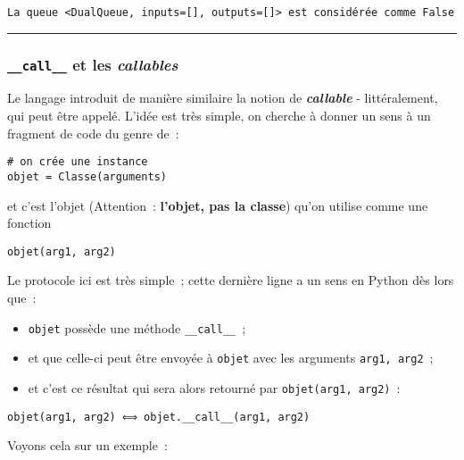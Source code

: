     \begin{Verbatim}[commandchars=\\\{\}]
La queue <DualQueue, inputs=[], outputs=[]> est considérée comme False

    \end{Verbatim}

    \begin{center}\rule{0.5\linewidth}{\linethickness}\end{center}

    \hypertarget{call__-et-les-callables}{%
\subsubsection{\texorpdfstring{\texttt{\_\_call\_\_} et les
\emph{callables}}{\_\_call\_\_ et les callables}}\label{call__-et-les-callables}}

    Le langage introduit de manière similaire la notion de
\textbf{\emph{callable}} - littéralement, qui peut être appelé. L'idée
est très simple, on cherche à donner un sens à un fragment de code du
genre de~:

    \begin{verbatim}
# on crée une instance
objet = Classe(arguments)
\end{verbatim}

et c'est l'objet (Attention~: \textbf{l'objet, pas la classe}) qu'on
utilise comme une fonction

\begin{verbatim}
objet(arg1, arg2)
\end{verbatim}

    Le protocole ici est très simple~; cette dernière ligne a un sens en
Python dès lors que~:

\begin{itemize}
\tightlist
\item
  \texttt{objet} possède une méthode \texttt{\_\_call\_\_}~;
\item
  et que celle-ci peut être envoyée à \texttt{objet} avec les arguments
  \texttt{arg1,\ arg2}~;
\item
  et c'est ce résultat qui sera alors retourné par
  \texttt{objet(arg1,\ arg2)}~:
\end{itemize}

    \begin{verbatim}
objet(arg1, arg2) ⟺ objet.__call__(arg1, arg2)
\end{verbatim}

    Voyons cela sur un exemple~:

